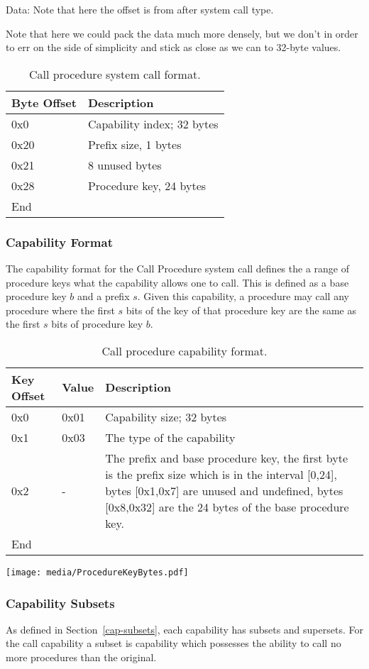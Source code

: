 \documentclass[english,a4paper]{article}
\let\oldparagraph\subsubsection
\renewcommand{\subsubsection}[1]{\oldparagraph{#1}\mbox{}}
\begin{document}
Data: Note that here the offset is from after system call type.

Note that here we could pack the data much more densely, but we don't in order
to err on the side of simplicity and stick as close as we can to 32-byte values.

\begin{table}[H]
  \caption{Call procedure system call format.}
  \centering{}%
  \begin{tabular}{l|p{}}
    \hline
    Byte Offset & Description\tabularnewline
    \hline
    \hline
    0x0 & Capability index; 32 bytes \tabularnewline
    0x20 & Prefix size, 1 bytes \tabularnewline
    0x21 & 8 unused bytes \tabularnewline
    0x28 & Procedure key, 24 bytes \tabularnewline
    \hline
    End &  \tabularnewline
    \hline
  \end{tabular}
\end{table}

\subsubsection{Capability Format}
The capability format for the Call Procedure system call defines the a range of
procedure keys what the capability allows one to call. This is defined as a base
procedure key $b$ and a prefix $s$. Given this capability, a procedure may call
any procedure where the first $s$ bits of the key of that procedure key are the
same as the first $s$ bits of procedure key $b$.

\begin{table}[H]
  \caption{Call procedure capability format.}
  \centering{}%
  \begin{tabular}{l|l|p{}}
    \hline
    Key Offset & Value & Description\tabularnewline
    \hline
    \hline
    0x0 & 0x01 & Capability size; 32 bytes \tabularnewline
    0x1 & 0x03 & The type of the capability \tabularnewline
    0x2 & -    & The prefix and base procedure key, the first byte is the prefix
                 size which is in the interval [0,24], bytes [0x1,0x7] are
                 unused and undefined, bytes [0x8,0x32] are the 24 bytes of the
                 base procedure key. \tabularnewline
    \hline
    End &  \tabularnewline
    \hline
  \end{tabular}
\end{table}

\texttt{[image: media/ProcedureKeyBytes.pdf]}

\subsubsection{Capability Subsets}
As defined in Section~\ref{cap-subsets}, each capability has subsets and
supersets. For the call capability a subset is capability which possesses the
ability to call no more procedures than the original.
\end{document}
